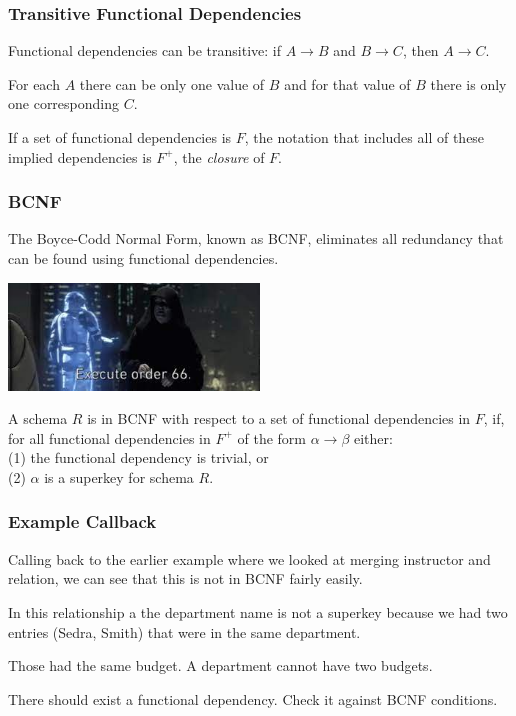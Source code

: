 \begin{frame}
\frametitle{Transitive Functional Dependencies}

Functional dependencies can be transitive: if $A \rightarrow B$ and $B \rightarrow C$, then $A \rightarrow C$. 

For each $A$ there can be only one value of $B$ and for that value of $B$ there is only one corresponding $C$. 

If a set of functional dependencies is $F$, the notation that includes all of these implied dependencies is $F^{+}$, the \textit{closure} of $F$.


\end{frame}



\begin{frame}
\frametitle{BCNF}

The \alert{Boyce-Codd Normal Form}, known as BCNF, eliminates all redundancy that can be found using functional dependencies.

\begin{center}
	\includegraphics[width=0.5\textwidth]{images/order66.jpg}
\end{center}

A schema $R$ is in BCNF with respect to a set of functional dependencies in $F$, if, for all functional dependencies in $F^{+}$ of the form $\alpha \rightarrow \beta$ either: \\
\quad (1) the functional dependency is trivial, or\\
\quad (2) $\alpha$ is a superkey for schema $R$.


\end{frame}


\begin{frame}
\frametitle{Example Callback}
Calling back to the earlier example where we looked at merging instructor and relation, we can see that this is not in BCNF fairly easily. 

In this relationship a the department name is not a superkey because we had two entries (Sedra, Smith) that were in the same department.

Those had the same budget. A department cannot have two budgets.

There should exist a functional dependency. Check it against BCNF conditions.

\end{frame}


